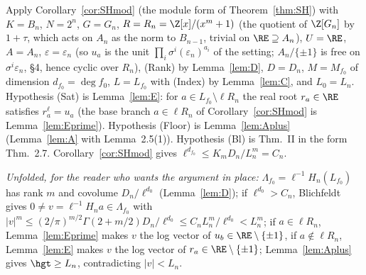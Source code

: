 Apply Corollary~\ref{cor:SHmod} (the module form of Theorem~\ref{thm:SH}) with $K=B_n$, $N=2^n$, $G=G_n$, $R=R_n=\Z[x]/(x^m+1)$ (the quotient of $\Z[G_n]$ by $1+\tau$, which acts on $A_n$ as the norm to $B_{n-1}$, trivial on $\RE\supseteq A_n$), $U=\RE$, $A=A_n$, $\varepsilon=\varepsilon_n$ (so $u_a$ is the unit $\prod_i\sigma^i(\varepsilon_n)^{a_i}$ of the setting; $A_n/\{\pm1\}$ is free on $\sigma^i\varepsilon_n$, \cite{KY} \S4, hence cyclic over $R_n$), (Rank) by Lemma~\ref{lem:D}, $D=D_n$, $M=M_{f_0}$ of dimension $d_{f_0}=\deg f_0$, $L=L_{f_0}$ with (Index) by Lemma~\ref{lem:C}, and $L_0=L_n$. Hypothesis (Sat) is Lemma~\ref{lem:E}: for $a\in L_{f_0}\setminus\ell R_n$ the real root $r_a\in\RE$ satisfies $r_a^{\ell}=u_a$ (the base branch $a\in\ell R_n$ of Corollary~\ref{cor:SHmod} is Lemma~\ref{lem:Eprime}). Hypothesis (Floor) is Lemma~\ref{lem:Aplus} (Lemma~\ref{lem:A} with \cite{MO16} Lemma~2.5(1)). Hypothesis (Bl) is \cite{Bl14} Thm.~II in the form \cite{MO16} Thm.~2.7. Corollary~\ref{cor:SHmod} gives $\ell^{d_{f_0}}\le K_mD_n/L_n^m=C_n$.

\emph{Unfolded, for the reader who wants the argument in place:} $\Lambda_{f_0}=\ell^{-1}H_n(L_{f_0})$ has rank $m$ and covolume $D_n/\ell^{d_0}$ (Lemma~\ref{lem:D}); if $\ell^{d_0}>C_n$, Blichfeldt gives $0\ne v=\ell^{-1}H_na\in\Lambda_{f_0}$ with $|v|^m\le(2/\pi)^{m/2}\Gamma(2+m/2)D_n/\ell^{d_0}\le C_nL_n^m/\ell^{d_0}<L_n^m$; if $a\in\ell R_n$, Lemma~\ref{lem:Eprime} makes $v$ the log vector of $u_b\in\RE\setminus\{\pm1\}$, if $a\notin\ell R_n$, Lemma~\ref{lem:E} makes $v$ the log vector of $r_a\in\RE\setminus\{\pm1\}$; Lemma~\ref{lem:Aplus} gives $\hgt\ge L_n$, contradicting $|v|<L_n$.
